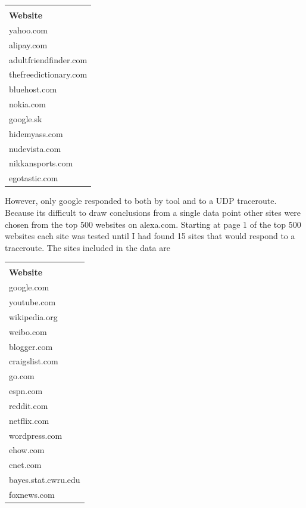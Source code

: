 \documentclass{article}
\begin{document}
\FloatBarrier
\begin{table}[h!]
  \begin{tabular}{|l|}
  \hline \\
  {\bf Website} \\ \hline
  yahoo.com \\ \hline
  alipay.com \\ \hline
  adultfriendfinder.com \\ \hline
  thefreedictionary.com \\ \hline
  bluehost.com \\ \hline
  nokia.com \\ \hline
  google.sk \\ \hline
  hidemyass.com \\ \hline
  nudevista.com \\ \hline
  nikkansports.com \\ \hline
  egotastic.com \\ \hline
  \end{tabular}
\end{table}
\FloatBarrier

However, only google responded to both by tool and to a UDP traceroute. Because its difficult to draw conclusions from a single data point other sites were chosen from the top 500 websites on alexa.com. Starting at page 1 of the top 500 websites each site was tested until I had found 15 sites that would respond to a traceroute. The sites included in the data are

\FloatBarrier
\begin{table}[h!]
  \begin{tabular}{|l|}
  \hline \\
  {\bf Website} \\ \hline
  google.com \\ \hline
  youtube.com \\ \hline
  wikipedia.org \\ \hline
  weibo.com \\ \hline
  blogger.com \\ \hline
  craigslist.com \\ \hline
  go.com \\ \hline
  espn.com \\ \hline
  reddit.com \\ \hline
  netflix.com \\ \hline
  wordpress.com \\ \hline
  ehow.com \\ \hline
  cnet.com \\ \hline
  bayes.stat.cwru.edu \\ \hline
  foxnews.com \\ \hline
  \end{tabular}
\end{table}
\FloatBarrier
\end{document}
